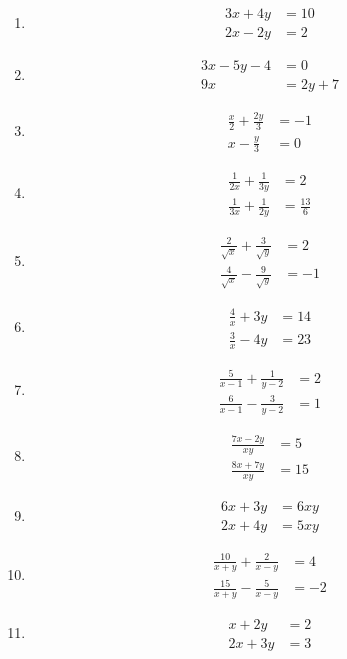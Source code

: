 \begin{multicols}{2}
\begin{enumerate}[label=\thesubsection.\arabic*,ref=\thesubsection.\theenumi]
\item \begin{align*}3x+4y&=10\\ 2x-2y&=2\end{align*}
\item \begin{align*}3x-5y-4&=0\\9x&=2y+7\end{align*}
\item \begin{align*}\frac{x}{2}+\frac{2y}{3}&=-1\\x-\frac{y}{3}&=0\end{align*}
\item
\begin{align*}
\frac{1}{2x}+\frac{1}{3y}&=2 \\ \frac{1}{3x}+\frac{1}{2y}&=\frac{13}{6}
\end{align*}
\item
\begin{align*}
\frac{2}{\sqrt{x}}+\frac{3}{\sqrt{y}}&=2\\
\frac{4}{\sqrt{x}}-\frac{9}{\sqrt{y}}&=-1
\end{align*}
\item
\begin{align*}
\frac{4}{x}+3y&=14\\ \frac{3}{x}-4y&=23
\end{align*}
\item
\begin{align*}
\frac{5}{x-1}+\frac{1}{y-2}&=2\\ \frac{6}{x-1}-\frac{3}{y-2}&=1
\end{align*}
\item
\begin{align*}
\frac{7x-2y}{xy}&=5\\ \frac{8x+7y}{xy}&=15
\end{align*}
\item
\begin{align*}
6x+3y&=6xy\\ 2x+4y&=5xy
\end{align*}
\item
\begin{align*}
\frac{10}{x+y}+\frac{2}{x-y}&=4\\ \frac{15}{x+y}-\frac{5}{x-y}&=-2
\end{align*}
\item  
\begin{align*}
 x+2y &= 2\\
2x+3y &= 3
\end{align*}

\end{enumerate}
\end{multicols}
